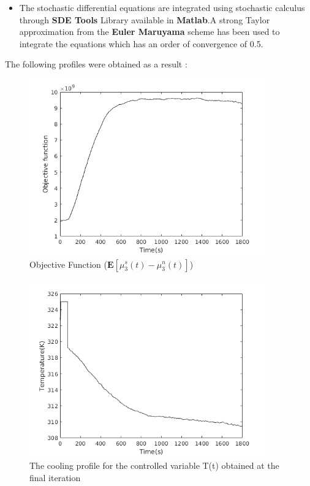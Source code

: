 \begin{itemize}
\item The stochastic differential equations are integrated using stochastic calculus through \textbf{SDE Tools} Library available in \textbf{Matlab}.A strong Taylor approximation from the \textbf{Euler Maruyama} scheme has been used to integrate the equations which has an order of convergence of 0.5. 
\end{itemize}
The following profiles were obtained as a result :
\begin{figure}[h!] 

\begin{center}
\includegraphics[width=4in]{Sobj.png}
\end{center}
\caption{Objective Function ($\mathbf{E}\left[\mu_{3}^{s}(t) - \mu_{3}^{n}(t)\right]$)}
\end{figure}
\begin{figure}[h!] 

\begin{center}
\includegraphics[width=4in]{Stemp.png}
\end{center}
\caption{The cooling profile for the controlled variable T(t) obtained at the final iteration}
\end{figure}

